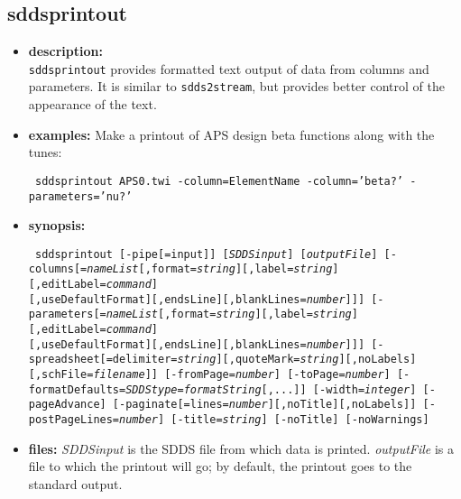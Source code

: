 \begin{latexonly}
\newpage
\end{latexonly}
\subsection{sddsprintout}
\label{sddsprintout}

\begin{itemize}
\item {\bf description:} \hspace*{1mm}\\
{\tt sddsprintout} provides formatted text output of data from columns and parameters.  It is similar to 
{\tt sdds2stream}, but provides better control of the appearance of the text.

\item {\bf examples:}
Make a printout of APS design beta functions along with the tunes:
\begin{flushleft}{\tt
sddsprintout APS0.twi -column=ElementName -column='beta?' -parameters='nu?' 
}\end{flushleft}

\item {\bf synopsis:} 
\begin{flushleft}{\tt
sddsprintout [-pipe[=input]] [{\em SDDSinput}] [{\em outputFile}] 
[-columns[={\em nameList}[,format={\em string}][,label={\em string}][,editLabel={\em command}]\\
 \hspace*{5mm} [,useDefaultFormat][,endsLine][,blankLines={\em number}]]]
[-parameters[={\em nameList}[,format={\em string}][,label={\em string}][,editLabel={\em command}] \\
 \hspace*{5mm} [,useDefaultFormat][,endsLine][,blankLines={\em number}]]]
[-spreadsheet[=delimiter={\em string}][,quoteMark={\em string}][,noLabels][,schFile={\em filename}]]
[-fromPage={\em number}] [-toPage={\em number}] 
[-formatDefaults={\em SDDStype}={\em formatString}[,...]]
[-width={\em integer}] [-pageAdvance] [-paginate[=lines={\em number}][,noTitle][,noLabels]]
[-postPageLines={\em number}] [-title={\em string}] [-noTitle] [-noWarnings]

}\end{flushleft}
\item {\bf files:}
{\em SDDSinput} is the SDDS file from which data is printed.  {\em outputFile} is a file to which the
printout will go; by default, the printout goes to the standard output.


\end{itemize}
